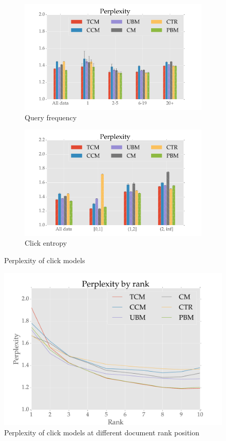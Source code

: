 \begin{figure}
	\centering
	\begin{subfigure}[b]{.49\textwidth}
		\centering
		\includegraphics[width=\textwidth]{figures/Perp_qf.pdf}
		\caption{Query frequency}
		\label{fig:perp_qf}
	\end{subfigure}
	\begin{subfigure}[b]{.49\textwidth}
		\centering
		\includegraphics[width=\textwidth]{figures/Perp_ce.pdf}
		\caption{Click entropy}
		\label{fig:perp_ce}
	\end{subfigure}
	\caption{Perplexity of click models}
\end{figure}

\begin{figure}
	\centering
	\includegraphics[width=.8\textwidth]{figures/Perp_rank.pdf}
	\caption{Perplexity of click models at different document rank position}
	\label{fig:perp_rank}
\end{figure}


